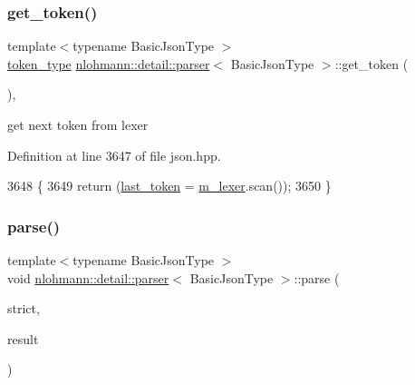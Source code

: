\subsubsection{\texorpdfstring{get\+\_\+token()}{get\_token()}}
{\footnotesize\ttfamily template$<$typename Basic\+Json\+Type $>$ \\
\hyperlink{classnlohmann_1_1detail_1_1parser_a21d247111b332785b7acf3f8e487d117}{token\+\_\+type} \hyperlink{classnlohmann_1_1detail_1_1parser}{nlohmann\+::detail\+::parser}$<$ Basic\+Json\+Type $>$\+::get\+\_\+token (\begin{DoxyParamCaption}{ }\end{DoxyParamCaption})\hspace{0.3cm}{\ttfamily [inline]}, {\ttfamily [private]}}



get next token from lexer 



Definition at line 3647 of file json.\+hpp.


\begin{DoxyCode}
3648     \{
3649         \textcolor{keywordflow}{return} (\hyperlink{classnlohmann_1_1detail_1_1parser_a932e49f6f4d291557846744319245994}{last\_token} = \hyperlink{classnlohmann_1_1detail_1_1parser_a22dcc815551a4052b87797b34171b352}{m\_lexer}.scan());
3650     \}
\end{DoxyCode}
\mbox{\label{classnlohmann_1_1detail_1_1parser_a14338d8f3174601c0b2b7ef28752ab17}} 
\subsubsection{\texorpdfstring{parse()}{parse()}}
{\footnotesize\ttfamily template$<$typename Basic\+Json\+Type $>$ \\
void \hyperlink{classnlohmann_1_1detail_1_1parser}{nlohmann\+::detail\+::parser}$<$ Basic\+Json\+Type $>$\+::parse (\begin{DoxyParamCaption}\item[{const bool}]{strict,  }\item[{Basic\+Json\+Type \&}]{result }\end{DoxyParamCaption})\hspace{0.3cm}{\ttfamily [inline]}}



